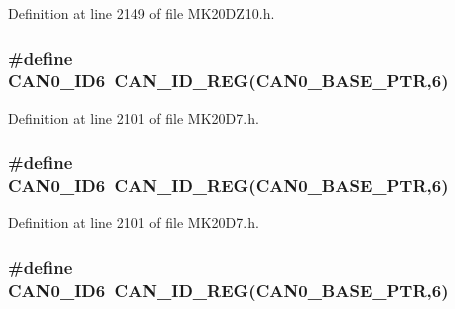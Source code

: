 Definition at line 2149 of file M\+K20\+D\+Z10.\+h.

\subsubsection[{\texorpdfstring{C\+A\+N0\+\_\+\+I\+D6}{CAN0_ID6}}]{\setlength{\rightskip}{0pt plus 5cm}\#define C\+A\+N0\+\_\+\+I\+D6~{\bf C\+A\+N\+\_\+\+I\+D\+\_\+\+R\+EG}({\bf C\+A\+N0\+\_\+\+B\+A\+S\+E\+\_\+\+P\+TR},6)}\hypertarget{group___c_a_n___register___accessor___macros_ga6260a652df181ee665915e52343d4206}{}\label{group___c_a_n___register___accessor___macros_ga6260a652df181ee665915e52343d4206}


Definition at line 2101 of file M\+K20\+D7.\+h.

\subsubsection[{\texorpdfstring{C\+A\+N0\+\_\+\+I\+D6}{CAN0_ID6}}]{\setlength{\rightskip}{0pt plus 5cm}\#define C\+A\+N0\+\_\+\+I\+D6~{\bf C\+A\+N\+\_\+\+I\+D\+\_\+\+R\+EG}({\bf C\+A\+N0\+\_\+\+B\+A\+S\+E\+\_\+\+P\+TR},6)}\hypertarget{group___c_a_n___register___accessor___macros_ga6260a652df181ee665915e52343d4206}{}\label{group___c_a_n___register___accessor___macros_ga6260a652df181ee665915e52343d4206}


Definition at line 2101 of file M\+K20\+D7.\+h.

\subsubsection[{\texorpdfstring{C\+A\+N0\+\_\+\+I\+D6}{CAN0_ID6}}]{\setlength{\rightskip}{0pt plus 5cm}\#define C\+A\+N0\+\_\+\+I\+D6~{\bf C\+A\+N\+\_\+\+I\+D\+\_\+\+R\+EG}({\bf C\+A\+N0\+\_\+\+B\+A\+S\+E\+\_\+\+P\+TR},6)}\hypertarget{group___c_a_n___register___accessor___macros_ga6260a652df181ee665915e52343d4206}{}\label{group___c_a_n___register___accessor___macros_ga6260a652df181ee665915e52343d4206}



